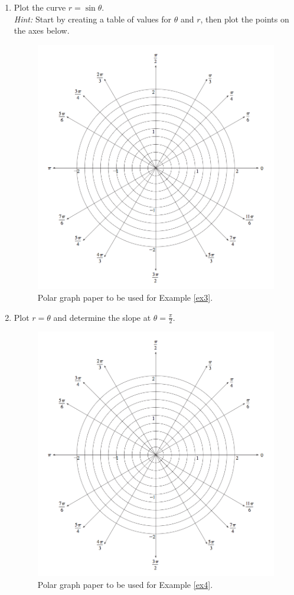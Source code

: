 \begin{enumerate}[{Example} 1:]

\addtocounter{enumi}{2}

\item 
Plot the curve \(r=\sin\theta\). \\
\textit{Hint:} Start by creating a table of values for \(\theta\) and \(r\), then plot the points on the axes below.\label{ex3}
\begin{figure}[!h]

\noindent\includegraphics[width=.5\textwidth]{PolarPaper.png} 
\caption{Polar graph paper to be used for Example \ref{ex3}.}
\end{figure}


\item 
Plot \(r=\theta\) and determine the slope at \(\theta = \frac{\pi}{2}\).\label{ex4}

\begin{figure}[!h]


\includegraphics[width=.5\textwidth]{PolarPaper.png}
\caption{Polar graph paper to be used for Example \ref{ex4}.}
\end{figure}


\end{enumerate}
